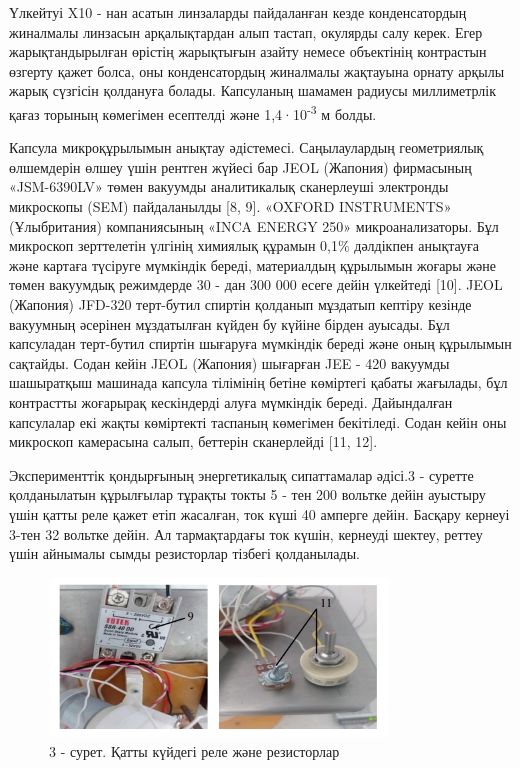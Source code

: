 \begin{multicols}{2}
Үлкейтуі X10 - нан асатын линзаларды пайдаланған кезде конденсатордың
жиналмалы линзасын арқалықтардан алып тастап, окулярды салу керек. Егер
жарықтандырылған өрістің жарықтығын азайту немесе объектінің контрастын
өзгерту қажет болса, оны конденсатордың жиналмалы жақтауына орнату
арқылы жарық сүзгісін қолдануға болады. Капсуланың шамамен радиусы
миллиметрлік қағаз торының көмегімен есептелді және
1,4·10\textsuperscript{-3} м болды.

Капсула микроқұрылымын анықтау әдістемесі. Саңылаулардың геометриялық
өлшемдерін өлшеу үшін рентген жүйесі бар JEOL (Жапония) фирмасының
«JSM-6390LV» төмен вакуумды аналитикалық сканерлеуші электронды
микроскопы (SEM) пайдаланылды {[}8, 9{]}. «OXFORD INSTRUMENTS»
(Ұлыбритания) компаниясының «INCA ENERGY 250» микроанализаторы. Бұл
микроскоп зерттелетін үлгінің химиялық құрамын 0,1\% дәлдікпен анықтауға
және картаға түсіруге мүмкіндік береді, материалдың құрылымын жоғары
және төмен вакуумдық режимдерде 30 - дан 300 000 есеге дейін үлкейтеді
{[}10{]}. JEOL (Жапония) JFD-320 терт-бутил спиртін қолданып мұздатып
кептіру кезінде вакуумның әсерінен мұздатылған күйден бу күйіне бірден
ауысады. Бұл капсуладан терт-бутил спиртін шығаруға мүмкіндік береді
және оның құрылымын сақтайды. Содан кейін JEOL (Жапония) шығарған JEE -
420 вакуумды шашыратқыш машинада капсула тілімінің бетіне көміртегі
қабаты жағылады, бұл контрастты жоғарырақ кескіндерді алуға мүмкіндік
береді. Дайындалған капсулалар екі жақты көміртекті таспаның көмегімен
бекітіледі. Содан кейін оны микроскоп камерасына салып, беттерін
сканерлейді {[}11, 12{]}.

Эксперименттік қондырғының энергетикалық сипаттамалар әдісі.3 - суретте
қолданылатын құрылғылар тұрақты токты 5 - тен 200 вольтке дейін ауыстыру
үшін қатты реле қажет етіп жасалған, ток күші 40 амперге дейін. Басқару
кернеуі 3-тен 32 вольтке дейін. Ал тармақтардағы ток күшін, кернеуді
шектеу, реттеу үшін айнымалы сымды резисторлар тізбегі қолданылады.
\end{multicols}


\begin{figure}[H]
	\centering
	\includegraphics[width=0.8\textwidth]{media/pish/image24}
	\caption*{3 - сурет. Қатты күйдегі реле және резисторлар}
\end{figure}


